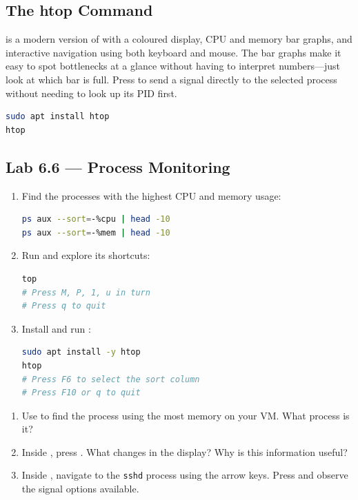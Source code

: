 \subsection{The htop Command}

 is a modern version of  with a coloured display, CPU and
memory bar graphs, and interactive navigation using both keyboard and mouse.
The bar graphs make it easy to spot bottlenecks at a glance without having to
interpret numbers---just look at which bar is full. Press  to
send a signal directly to the selected process without needing to look up its
PID first.

\begin{lstlisting}[language=bash, caption={Installing and using htop}]
sudo apt install htop
htop
\end{lstlisting}

\subsection*{Lab 6.6 --- Process Monitoring}

\begin{enumerate}
  \item Find the processes with the highest CPU and memory usage:
\begin{lstlisting}[language=bash, caption={Processes with the highest resource usage}]
ps aux --sort=-%cpu | head -10
ps aux --sort=-%mem | head -10
\end{lstlisting}

  \item Run  and explore its shortcuts:
\begin{lstlisting}[language=bash, caption={Exploring top}]
top
# Press M, P, 1, u in turn
# Press q to quit
\end{lstlisting}

  \item Install and run :
\begin{lstlisting}[language=bash, caption={Using htop}]
sudo apt install -y htop
htop
# Press F6 to select the sort column
# Press F10 or q to quit
\end{lstlisting}
\end{enumerate}

\begin{exercisebox}[6.6]
  \begin{enumerate}
    \item Use  to find the process using the most
      memory on your VM. What process is it?
    \item Inside , press . What changes in the display?
      Why is this information useful?
    \item Inside , navigate to the \texttt{sshd} process using the
      arrow keys. Press  and observe the signal options
      available.
  \end{enumerate}
\end{exercisebox}

